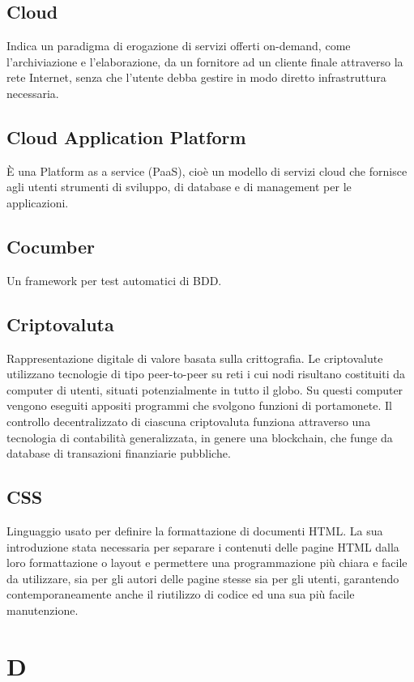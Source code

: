 \subsection*{Cloud}
Indica un paradigma di erogazione di servizi offerti on-demand, come l'archiviazione e l'elaborazione, da un fornitore ad un cliente finale attraverso la rete Internet, senza che l'utente debba gestire in modo diretto infrastruttura necessaria.

\subsection*{Cloud Application Platform}
È una Platform as a service (PaaS), cioè un modello di servizi cloud che fornisce agli utenti strumenti di sviluppo, di database e di management per le applicazioni.

\subsection*{Cocumber}
Un framework per test automatici di BDD\glo.

\subsection*{Criptovaluta}
Rappresentazione digitale di valore basata sulla crittografia. Le criptovalute utilizzano tecnologie di tipo peer-to-peer su reti i cui nodi risultano costituiti da computer di utenti, situati potenzialmente in tutto il globo. Su questi computer vengono eseguiti appositi programmi che svolgono funzioni di portamonete. Il controllo decentralizzato di ciascuna criptovaluta funziona attraverso una tecnologia di contabilità generalizzata, in genere una blockchain\glo, che funge da database di transazioni finanziarie pubbliche. 

\subsection*{CSS}
Linguaggio usato per definire la formattazione di documenti HTML. La sua introduzione  stata necessaria per separare i contenuti delle pagine HTML dalla loro formattazione o layout e permettere una programmazione più chiara e facile da utilizzare, sia per gli autori delle pagine stesse sia per gli utenti, garantendo contemporaneamente anche il riutilizzo di codice ed una sua più facile manutenzione.

\section*{D}

